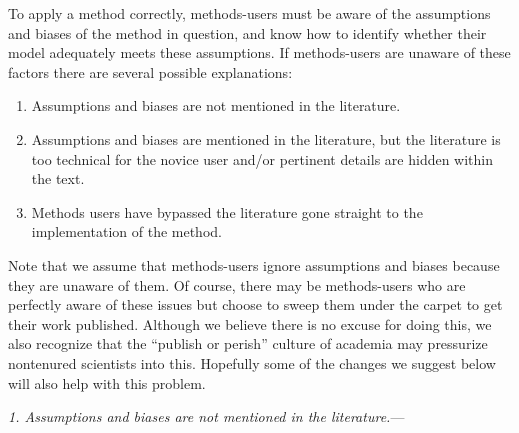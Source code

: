 \documentclass[a4paper,12pt]{article}
\renewcommand{\subsubsection}[1]{%
\vspace{2ex}
\noindent
\textit{#1.}---}
\begin{document}
To apply a method correctly, methods-users must be aware of the assumptions and biases of the method in question, and know how to identify whether their model adequately meets these assumptions. If methods-users are unaware of these factors there are several possible explanations:

\begin{enumerate}
\item Assumptions and biases are not mentioned in the literature.
\item Assumptions and biases are mentioned in the literature, but the literature is too technical for the novice user and/or pertinent details are hidden within the text.
\item Methods users have bypassed the literature gone straight to the implementation of the method.
\end{enumerate}

Note that we assume that methods-users ignore assumptions and biases because they are unaware of them. Of course, there may be methods-users who are perfectly aware of these issues but choose to sweep them under the carpet to get their work published. Although we believe there is no excuse for doing this, we also recognize that the ``publish or perish'' culture of academia may pressurize nontenured scientists into this. Hopefully some of the changes we suggest below will also help with this problem.

\subsubsection{1. Assumptions and biases are not mentioned in the literature}




\end{document}
